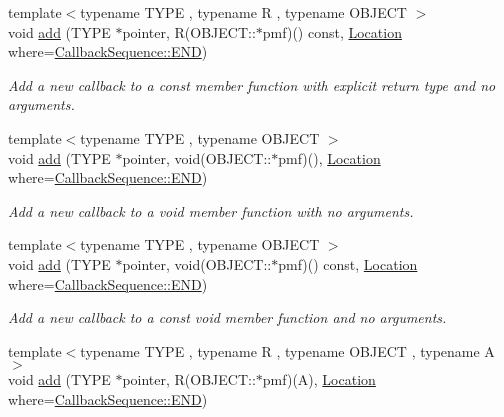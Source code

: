 \begin{DoxyCompactItemize}
{\footnotesize template$<$typename T\+Y\+PE , typename R , typename O\+B\+J\+E\+CT $>$ }\\void \hyperlink{struct_d_d4hep_1_1_callback_sequence_ac3d546759574b29074d0153fa8d72175}{add} (T\+Y\+PE $\ast$pointer, R(O\+B\+J\+E\+C\+T\+::$\ast$pmf)() const, \hyperlink{struct_d_d4hep_1_1_callback_sequence_a7753490247479633aed16a2376821ef7}{Location} where=\hyperlink{struct_d_d4hep_1_1_callback_sequence_a7753490247479633aed16a2376821ef7ac39eeb1bcfc1c235ab1d0d9315c310ac}{Callback\+Sequence\+::\+E\+ND})
\begin{DoxyCompactList}\small\item\em Add a new callback to a const member function with explicit return type and no arguments. \end{DoxyCompactList}\item 
{\footnotesize template$<$typename T\+Y\+PE , typename O\+B\+J\+E\+CT $>$ }\\void \hyperlink{struct_d_d4hep_1_1_callback_sequence_aa6d53268b3bcd96d95773e8c12dbd6b6}{add} (T\+Y\+PE $\ast$pointer, void(O\+B\+J\+E\+C\+T\+::$\ast$pmf)(), \hyperlink{struct_d_d4hep_1_1_callback_sequence_a7753490247479633aed16a2376821ef7}{Location} where=\hyperlink{struct_d_d4hep_1_1_callback_sequence_a7753490247479633aed16a2376821ef7ac39eeb1bcfc1c235ab1d0d9315c310ac}{Callback\+Sequence\+::\+E\+ND})
\begin{DoxyCompactList}\small\item\em Add a new callback to a void member function with no arguments. \end{DoxyCompactList}\item 
{\footnotesize template$<$typename T\+Y\+PE , typename O\+B\+J\+E\+CT $>$ }\\void \hyperlink{struct_d_d4hep_1_1_callback_sequence_aac9098e7f436bd431f86f812cf2c65cd}{add} (T\+Y\+PE $\ast$pointer, void(O\+B\+J\+E\+C\+T\+::$\ast$pmf)() const, \hyperlink{struct_d_d4hep_1_1_callback_sequence_a7753490247479633aed16a2376821ef7}{Location} where=\hyperlink{struct_d_d4hep_1_1_callback_sequence_a7753490247479633aed16a2376821ef7ac39eeb1bcfc1c235ab1d0d9315c310ac}{Callback\+Sequence\+::\+E\+ND})
\begin{DoxyCompactList}\small\item\em Add a new callback to a const void member function and no arguments. \end{DoxyCompactList}\item 
{\footnotesize template$<$typename T\+Y\+PE , typename R , typename O\+B\+J\+E\+CT , typename A $>$ }\\void \hyperlink{struct_d_d4hep_1_1_callback_sequence_a7e67d853e86f3fbef9b0ef5b059eb652}{add} (T\+Y\+PE $\ast$pointer, R(O\+B\+J\+E\+C\+T\+::$\ast$pmf)(A), \hyperlink{struct_d_d4hep_1_1_callback_sequence_a7753490247479633aed16a2376821ef7}{Location} where=\hyperlink{struct_d_d4hep_1_1_callback_sequence_a7753490247479633aed16a2376821ef7ac39eeb1bcfc1c235ab1d0d9315c310ac}{Callback\+Sequence\+::\+E\+ND})

\end{DoxyCompactItemize}

